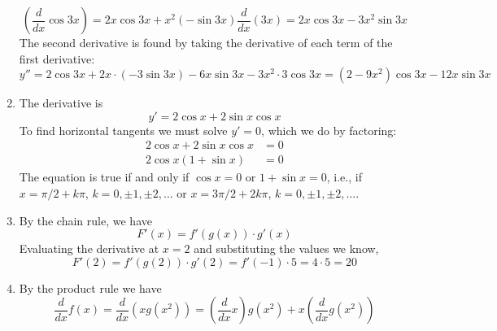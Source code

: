 \documentclass{article}
\begin{document}
\begin{enumerate}
\begin{equation*}
    \left(\frac{d}{dx} \cos 3x \right)
    = 2x \cos 3x + x^2 (-\sin 3x) \frac{d}{dx} (3x) = 2x\cos 3x -
    3x^2\sin 3x
  \end{equation*}
  The second derivative is found by taking the derivative of each term
  of the first derivative:
  \begin{equation*}
    y'' = 2\cos 3x + 2x\cdot (-3\sin 3x) - 6x \sin 3x - 3x^2 \cdot
    3\cos 3x = (2-9x^2)\cos 3x -12x\sin 3x
  \end{equation*}
\item %
  The derivative is
  \begin{equation*}
    y' = 2\cos x + 2\sin x \cos x
  \end{equation*}
  To find horizontal tangents we must solve $y'=0$, which we do by
  factoring:
  \begin{align*}
    2\cos x + 2\sin x \cos x &= 0
    \\
    2\cos x(1 + \sin x) &= 0
  \end{align*}
  The equation is true if and only if $\cos x =0$ or $1+\sin x = 0$,
  i.e., if $x=\pi/2 + k\pi$, $k=0,\pm 1, \pm 2, \ldots$ or
  $x=3\pi/2+2k\pi$, $k=0,\pm 1, \pm 2, \ldots$.
\item %
  By the chain rule, we have
  \begin{equation*}
    F'(x) = f'(g(x)) \cdot g'(x)
  \end{equation*}
  Evaluating the derivative at $x=2$ and substituting the values we know,
  \begin{equation*}
    F'(2) = f'(g(2)) \cdot g'(2) = f'(-1) \cdot 5 = 4 \cdot 5 = 20
  \end{equation*}
\item %
  By the product rule we have
  \begin{equation*}
    \frac{d}{dx} f(x) = \frac{d}{dx} (x g(x^2)) = \left(\frac{d}{dx}
    x\right) g(x^2) + x \left(\frac{d}{dx} g(x^2) \right) 

\end{equation*}
\end{enumerate}
\end{document}
